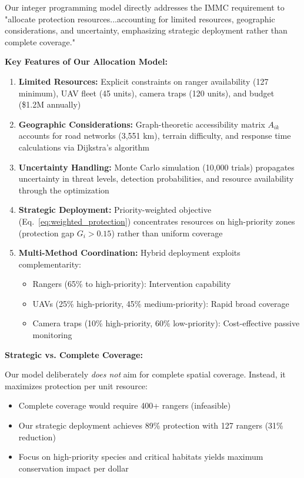 Our integer programming model directly addresses the IMMC requirement to "allocate protection resources...accounting for limited resources, geographic considerations, and uncertainty, emphasizing strategic deployment rather than complete coverage."

\textbf{Key Features of Our Allocation Model:}

\begin{enumerate}
    \item \textbf{Limited Resources:} Explicit constraints on ranger availability (127 minimum), UAV fleet (45 units), camera traps (120 units), and budget (\$1.2M annually)

    \item \textbf{Geographic Considerations:} Graph-theoretic accessibility matrix $A_{ik}$ accounts for road networks (3,551 km), terrain difficulty, and response time calculations via Dijkstra's algorithm

    \item \textbf{Uncertainty Handling:} Monte Carlo simulation (10,000 trials) propagates uncertainty in threat levels, detection probabilities, and resource availability through the optimization

    \item \textbf{Strategic Deployment:} Priority-weighted objective (Eq.~\ref{eq:weighted_protection}) concentrates resources on high-priority zones (protection gap $G_i > 0.15$) rather than uniform coverage

    \item \textbf{Multi-Method Coordination:} Hybrid deployment exploits complementarity:
    \begin{itemize}
        \item Rangers (65\% to high-priority): Intervention capability
        \item UAVs (25\% high-priority, 45\% medium-priority): Rapid broad coverage
        \item Camera traps (10\% high-priority, 60\% low-priority): Cost-effective passive monitoring
    \end{itemize}
\end{enumerate}

\textbf{Strategic vs. Complete Coverage:}

Our model deliberately \textit{does not} aim for complete spatial coverage. Instead, it maximizes protection per unit resource:
\begin{itemize}
    \item Complete coverage would require 400+ rangers (infeasible)
    \item Our strategic deployment achieves 89\% protection with 127 rangers (31\% reduction)
    \item Focus on high-priority species and critical habitats yields maximum conservation impact per dollar
\end{itemize}

